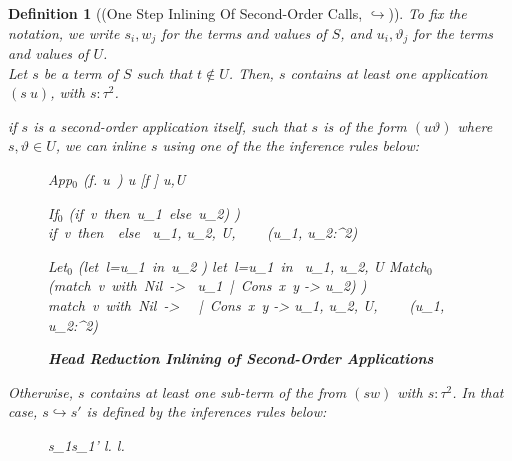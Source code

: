\documentclass[a4paper,11pt,oneside]{article}
\theoremstyle{plain}
\newtheorem{definition}{Definition}[subsection]
\newcommand{\tmlet}[3]{let~#1=#2~in~#3}
\newcommand{\tmsbst}[3]{#1 [#2 \mapsfrom #3] }
\newcommand{\icarr}{\hookrightarrow}
\newcommand{\ic}[2]{#1 \icarr #2}
\begin{document}
\begin{definition}[(One Step Inlining Of Second-Order Calls, $\icarr$)]
	To fix the notation, we write $s_i,w_j$ for the terms and values of $S$, and $u_i, 		
	\vartheta_j$  for the terms and values of $U$. \\
	
	Let $s$ be a term of $S$ such that $t \not\in U$. 
  Then, $s$ contains at least one application $(s~u)$, with $s : \tau^2$.
	
  if $s$ is a second-order application itself, such that 
  $s$ is of the form $(u \vartheta)$ where $s, \vartheta \in U$, 
  we can inline $s$ using one of the the inference rules below:	
	\begin{figure}[H]
		\begin{footnotesize}
	\begin{adjustwidth}{-10em}{0em}

	\begin{multicols}{2}
	\icrulehead
		{App$_0$}
		{(\lambda f. u~\vartheta)}
		{\tmsbst{u}{f}{\vartheta}}
		{u,\vartheta \in U} 
	\vspace*{0.5cm}
	
	\icrulehead
		{If$_0$}
		{(\boldsymbol{(}if~v~then~u_1~else~u_2{)} \boldsymbol{\vartheta}) \\}
		{if~v~then~~else~}
		{u_1, u_2, \vartheta \in U, ~~~ (u_1, u_2:\tau^2)}	

	\icrulehead
		{Let$_0$}
		{(\boldsymbol{(}\tmlet{l}{u_1}{u_2}\boldsymbol{)} \boldsymbol{\vartheta})}
		{\tmlet{l}{u_1}{}} 
		{u_1, u_2, \vartheta \in U}	
		\vspace*{0.5cm}
	\icrulehead
		{Match$_0$}
		{(\boldsymbol{(}match~v~with~Nil~->~ u_1~|~Cons~x~y -> u_2{)} \boldsymbol{\vartheta}) \\}
		{match~v~with~Nil~->~ ~|~Cons~x~y -> }
		{u_1, u_2, \vartheta \in U, ~~~ (u_1, u_2:\tau^2)}				
	\end{multicols}
		\end{adjustwidth}	
		\caption{ \textbf{Head Reduction Inlining of Second-Order Applications}\hfill}
 	\label{fig:inl-app-h-d}
 		\end{footnotesize}
	\end{figure}

Otherwise, $s$ contains at least one sub-term of the from $(s w)$ with $s : \tau^2$.
In that case, $\ic{s}{s'}$ is defined by the inferences rules below:
	\begin{figure}[H]
	\begin{footnotesize}
	\begin{adjustwidth}{-8em}{-3em}
	\begin{multicols}{2}	
	\icrule{Fun}
		{s_1}{s_1'}
		{\lambda l. }{\lambda l. \boldsymbol{s_1'}}	
		{}\vspace*{0.5cm}
				

\end{multicols}
\end{adjustwidth}
\end{footnotesize}
\end{figure}
\end{definition}
\end{document}
